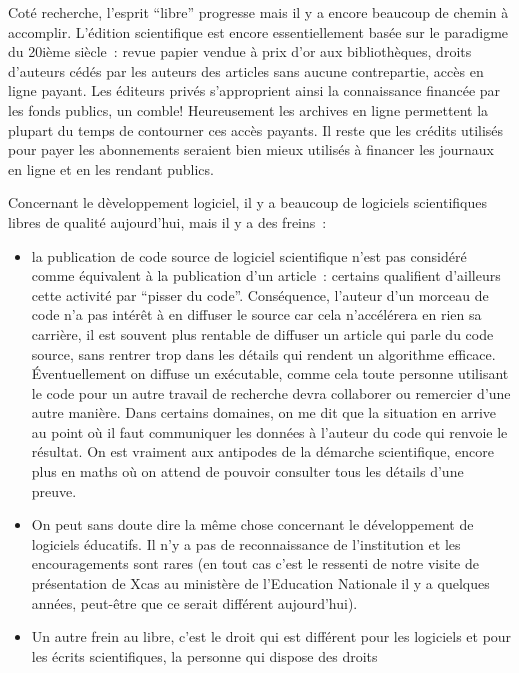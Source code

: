 \documentclass[a4paper,11pt]{article}
\begin{document}
\begin{giacjshere}
Cot\'e recherche, l'esprit ``libre'' progresse mais il y a encore
beaucoup de chemin \`a accomplir. L'\'edition scientifique
est encore essentiellement bas\'ee sur le paradigme du 20i\`eme
si\`ecle~: revue papier vendue \`a prix d'or aux biblioth\`eques,
droits d'auteurs c\'ed\'es par les auteurs des articles sans aucune
contrepartie, acc\`es en ligne payant. Les \'editeurs priv\'es
s'approprient ainsi la connaissance financ\'ee par les fonds publics,
un comble!
Heureusement les archives en ligne permettent la plupart
du temps de contourner ces acc\`es payants. Il reste
que les cr\'edits utilis\'es pour payer les abonnements seraient
bien mieux utilis\'es \`a financer les journaux en ligne et en
les rendant publics.

Concernant le d\`eveloppement logiciel,
il y a beaucoup de logiciels scientifiques libres de qualit\'e aujourd'hui, mais
il y a des freins~:
\begin{itemize}
\item la publication de code source de logiciel scientifique n'est pas
consid\'er\'e comme \'equivalent \`a la publication d'un article~:
certains qualifient d'ailleurs cette activit\'e par ``pisser du
code''. 
Cons\'equence, l'auteur d'un morceau de code n'a pas int\'er\^et
\`a en diffuser le source car cela n'acc\'el\'erera en rien
sa carri\`ere, il est souvent plus rentable
de diffuser un article qui parle du code source,
sans rentrer trop dans les
d\'etails qui rendent un algorithme efficace. \'Eventuellement
on diffuse un ex\'ecutable,
comme cela toute personne utilisant le code pour un autre
travail de recherche devra collaborer
ou remercier d'une autre mani\`ere. Dans certains
domaines, on me dit que la situation en arrive au point
o\`u il faut communiquer
les donn\'ees \`a l'auteur du code qui renvoie le r\'esultat.
On est vraiment aux antipodes de la d\'emarche scientifique,
encore plus en maths o\`u on attend de pouvoir consulter
tous les d\'etails d'une preuve.
\item On peut sans doute dire la m\^eme chose concernant
le d\'eveloppement de logiciels
\'educatifs. Il n'y a pas de reconnaissance de l'institution et
les encouragements sont rares (en tout cas c'est le ressenti
de notre visite de pr\'esentation de Xcas
au minist\`ere de l'Education Nationale
il y a quelques ann\'ees, peut-\^etre que ce serait diff\'erent
aujourd'hui).
\item Un autre frein au libre, c'est le droit qui est diff\'erent pour les logiciels
et pour les \'ecrits scientifiques, la personne qui dispose des droits

\end{itemize}
\end{giacjshere}
\end{document}
